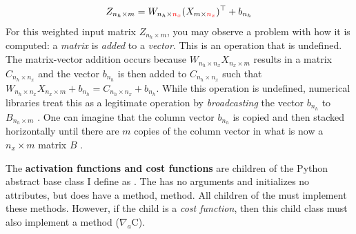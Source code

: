 \documentclass{article}
\begin{document}
\begin{align}
	Z_{n_h \times m} =
	W_{n_h \times \begingroup\color{red}n_x\endgroup} (X_{m \times \begingroup\color{red}n_x\endgroup})^{\top} + b_{n_h}
\end{align}
For this weighted input matrix $Z_{n_h \times m}$, you may observe a problem with how
it is computed:
a \textit{matrix} is \textit{added} to a \textit{vector}. This is an operation that is undefined.
The matrix-vector addition occurs because $W_{n_h \times n_x}X_{n_x \times m}$
results in a matrix $C_{n_h \times n_x}$ and the vector $b_{n_h}$ is then added
to $C_{n_h \times n_x}$ such that
$W_{n_h \times n_x}X_{n_x \times m} + b_{n_h} = C_{n_h \times n_x} + b_{n_h}$.
While this operation is undefined, numerical libraries treat this as a legitimate
operation by \textit{broadcasting} the vector $b_{n_h}$ to $B_{n_h \times m}$ \cite{Goodfellow2016,NumPyBroadcasting2021}.
One can imagine that the column vector $b_{n_h}$ is copied and
then stacked horizontally until there are $m$ copies of the column vector in
what is now a $n_x \times m$ matrix $B$ .



The \textbf{activation functions and cost functions} are children of the Python
abstract base class I define as . The
 has no arguments and initializes no attributes, but
does have a  method,  method. All
children of the  must implement these methods. However, if
the child is a \textit{cost function}, then this child class must also
implement a  method ($\nabla_{a}\text{C}$).

\pagebreak
\printbibliography
\end{document}

